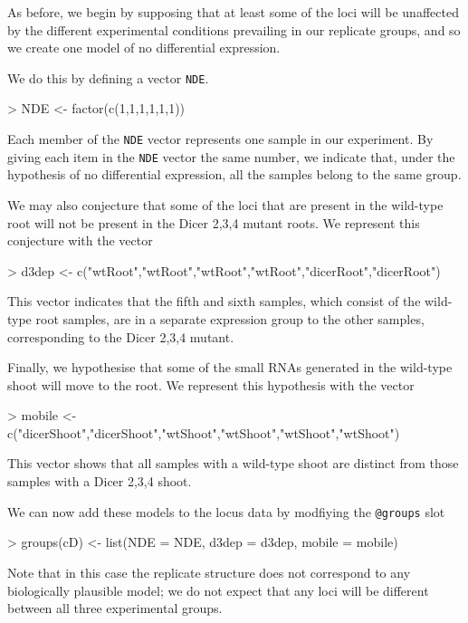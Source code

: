 \documentclass[a4paper]{article}
\begin{document}
As before, we begin by supposing that at least some of the loci will be unaffected by the different experimental conditions prevailing in our replicate groups, and so we create one model of no differential expression. 

We do this by defining a vector \verb'NDE'.
\begin{Schunk}
\begin{Sinput}
> NDE <- factor(c(1,1,1,1,1,1))
\end{Sinput}
\end{Schunk}
Each member of the \verb'NDE' vector represents one sample in our experiment. By giving each item in the \verb'NDE' vector the same number, we indicate that, under the hypothesis of no differential expression, all the samples belong to the same group.

We may also conjecture that some of the loci that are present in the wild-type root will not be present in the Dicer 2,3,4 mutant roots. We represent this conjecture with the vector
\begin{Schunk}
\begin{Sinput}
> d3dep <- c("wtRoot","wtRoot","wtRoot","wtRoot","dicerRoot","dicerRoot")
\end{Sinput}
\end{Schunk}
This vector indicates that the fifth and sixth samples, which consist of the wild-type root samples, are in a separate expression group to the other samples, corresponding to the Dicer 2,3,4 mutant.

Finally, we hypothesise that some of the small RNAs generated in the wild-type shoot will move to the root. We represent this hypothesis with the vector
\begin{Schunk}
\begin{Sinput}
> mobile <- c("dicerShoot","dicerShoot","wtShoot","wtShoot","wtShoot","wtShoot")
\end{Sinput}
\end{Schunk}
This vector shows that all samples with a wild-type shoot are distinct from those samples with a Dicer 2,3,4 shoot.

We can now add these models to the locus data by modfiying the \verb'@groups' slot
\begin{Schunk}
\begin{Sinput}
> groups(cD) <- list(NDE = NDE, d3dep = d3dep, mobile = mobile)  
\end{Sinput}
\end{Schunk}

Note that in this case the replicate structure does not correspond to any biologically plausible model; we do not expect that any loci will be different between all three experimental groups.
\end{document}
